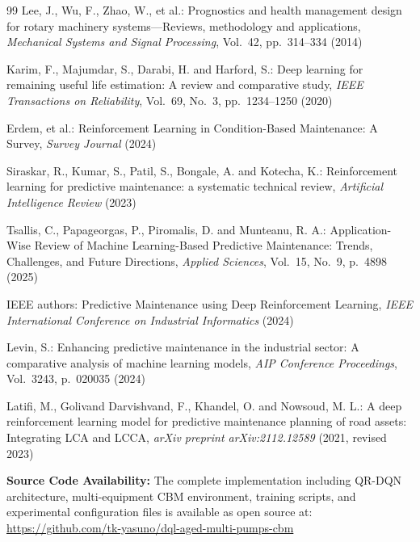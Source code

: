 \documentclass[twocolumn]{article}
\begin{document}
\begin{thebibliography}{99}
Lee, J., Wu, F., Zhao, W., et al.:
Prognostics and health management design for rotary machinery systems—Reviews, methodology and applications,
{\em Mechanical Systems and Signal Processing}, Vol.~42, pp.~314--334 (2014)

Karim, F., Majumdar, S., Darabi, H. and Harford, S.:
Deep learning for remaining useful life estimation: A review and comparative study,
{\em IEEE Transactions on Reliability}, Vol.~69, No.~3, pp.~1234--1250 (2020)

Erdem, et al.:
Reinforcement Learning in Condition-Based Maintenance: A Survey,
{\em Survey Journal} (2024)

Siraskar, R., Kumar, S., Patil, S., Bongale, A. and Kotecha, K.:
Reinforcement learning for predictive maintenance: a systematic technical review,
{\em Artificial Intelligence Review} (2023)

Tsallis, C., Papageorgas, P., Piromalis, D. and Munteanu, R. A.:
Application-Wise Review of Machine Learning-Based Predictive Maintenance: Trends, Challenges, and Future Directions,
{\em Applied Sciences}, Vol.~15, No.~9, p.~4898 (2025)

IEEE authors:
Predictive Maintenance using Deep Reinforcement Learning,
{\em IEEE International Conference on Industrial Informatics} (2024)

Levin, S.:
Enhancing predictive maintenance in the industrial sector: A comparative analysis of machine learning models,
{\em AIP Conference Proceedings}, Vol.~3243, p.~020035 (2024)

Latifi, M., Golivand Darvishvand, F., Khandel, O. and Nowsoud, M. L.:
A deep reinforcement learning model for predictive maintenance planning of road assets: Integrating LCA and LCCA,
{\em arXiv preprint arXiv:2112.12589} (2021, revised 2023)

\end{thebibliography}

\vspace{0.5em}
\noindent
\textbf{Source Code Availability:} The complete implementation including QR-DQN architecture, multi-equipment CBM environment, training scripts, and experimental configuration files is available as open source at: \url{https://github.com/tk-yasuno/dql-aged-multi-pumps-cbm}
\end{document}
